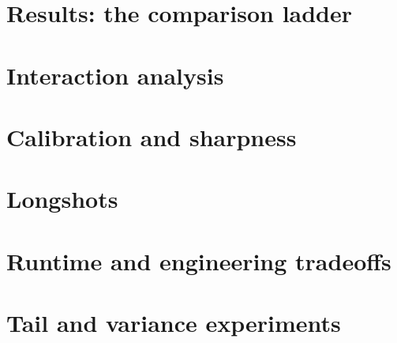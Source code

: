 \documentclass[11pt,a4paper]{article}
\begin{document}


\section{Results: the comparison ladder}



\section{Interaction analysis}



\section{Calibration and sharpness}



\section{Longshots}



\section{Runtime and engineering tradeoffs}



\section{Tail and variance experiments}
\end{document}
